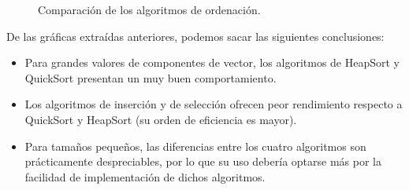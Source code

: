 \documentclass{homework}
\begin{document}
    \begin{figure}[H]
        \centering


        \caption{Comparación de los algoritmos de ordenación.}

        \label{orden}
    \end{figure}
    
    De las gráficas extraídas anteriores, podemos sacar las siguientes conclusiones:
    
    \begin{itemize}
        \item Para grandes valores de componentes de vector, los algoritmos de HeapSort y QuickSort presentan un muy buen comportamiento.
        \item Los algoritmos de inserción y de selección ofrecen peor rendimiento respecto a QuickSort y HeapSort (su orden de eficiencia es mayor).
        \item Para tamaños pequeños, las diferencias entre los cuatro algoritmos son prácticamente despreciables, por lo que su uso debería optarse más por la facilidad de implementación de dichos algoritmos. 
    \end{itemize}
\end{document}
